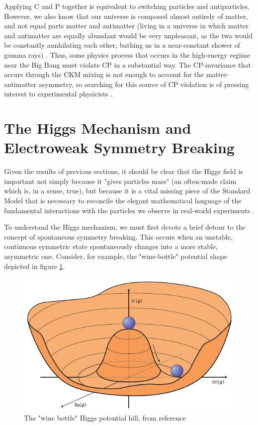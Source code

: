 Applying C and P together is equivalent to switching particles and antiparticles. However, we also know that our universe is composed almost entirely of matter, and not equal parts matter and antimatter (living in a universe in which matter and antimatter are equally abundant would be very unpleasant, as the two would be constantly annhilating each other, bathing us in a near-constant shower of gamma rays) \cite{Sakharov}. Thus, some physics process that occurs in the high-energy regime near the Big Bang must violate CP in a substantial way. The CP-invariance that occurs through the CKM mixing is not enough to account for the matter-antimatter asymmetry, so searching for this source of CP violation is of pressing interest to experimental physicists \cite{CKM}.

\section{The Higgs Mechanism and Electroweak Symmetry Breaking} \label{sec:EWSB} 

Given the results of previous sections, it should be clear that the Higgs field is important not simply because it "gives particles mass" (an often-made claim which is, in a sense, true), but because it is a vital missing piece of the Standard Model that is necessary to reconcile the elegant mathematical language of the fundamental interactions with the particles we observe in real-world experiments \cite{Higgs}.

To understand the Higgs mechanism, we must first devote a brief detour to the concept of spontaneous symmetry breaking. This occurs when an unstable, continuous symmetric state spontaneously changes into a more stable, asymmetric one. Consider, for example, the "wine-bottle" potential shape depicted in figure \ref{fig:potential}.

\begin{figure}
\includegraphics[width=\linewidth]{figures/theory_chapter/higgspotential.png}
\caption{The "wine bottle" Higgs potential hill, from reference \cite{EllisHiggs}}
\label{fig:potential}
\end{figure}

